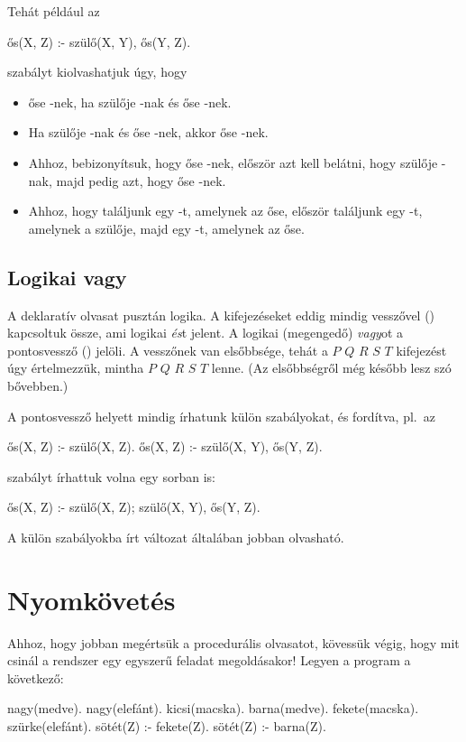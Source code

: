 Tehát például az
\begin{program}
ős(X, Z) :- szülő(X, Y), ős(Y, Z).
\end{program}
szabályt kiolvashatjuk úgy, hogy
\begin{itemize}
\item {} őse -nek, ha  szülője -nak és  őse -nek.
\item Ha  szülője -nak és  őse -nek, akkor  őse -nek.
\item Ahhoz, bebizonyítsuk, hogy  őse -nek, először azt kell belátni, hogy
   szülője -nak, majd pedig azt, hogy  őse -nek.
\item Ahhoz, hogy találjunk egy -t, amelynek  az őse, először találjunk
  egy -t, amelynek  a szülője, majd egy -t, amelynek  az őse.
\end{itemize}

\subsection*{Logikai vagy}
A deklaratív olvasat pusztán logika. A kifejezéseket
eddig mindig vesszővel (\pr{,}) kapcsoltuk össze,
ami logikai \emph{és}\/t jelent. A logikai
(megengedő) \emph{vagy}\/ot a pontosvessző (\pr{;})
jelöli. A vesszőnek van elsőbbsége, tehát a $P$ \pr{:-}
$Q$\pr{,} $R$\pr{;} $S$\pr{,} $T$ kifejezést
úgy értelmezzük, mintha
$P$ \pr{:-} \pr{(}$Q$\pr{,} $R$\pr{);} \pr{(}$S$\pr{,} $T$
lenne. (Az elsőbbségről
még később lesz szó bővebben.)\index{\pr{;}}

A pontosvessző helyett mindig írhatunk külön
szabályokat, és fordítva, pl.~az
\begin{program}
ős(X, Z) :- szülő(X, Z).
ős(X, Z) :- szülő(X, Y), ős(Y, Z).
\end{program}
szabályt írhattuk volna egy sorban is:
\begin{program}
ős(X, Z) :- szülő(X, Z); szülő(X, Y), ős(Y, Z).
\end{program}
A külön szabályokba írt változat általában jobban
olvasható.

\section{Nyomkövetés}
Ahhoz, hogy jobban megértsük a procedurális
olvasatot, kövessük végig, hogy mit csinál a
rendszer egy egyszerű feladat megoldásakor! Legyen a
program a következő:
\begin{program}
nagy(medve).
nagy(elefánt).
kicsi(macska).
barna(medve).
fekete(macska).
szürke(elefánt).
sötét(Z) :- fekete(Z).
sötét(Z) :- barna(Z).
\end{program}

